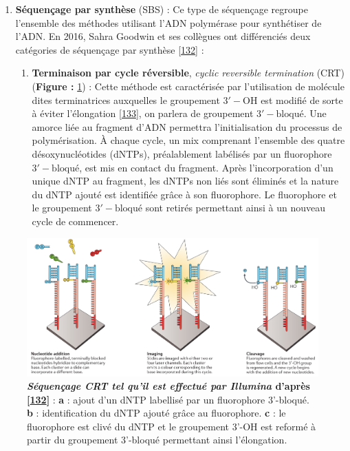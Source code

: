 \documentclass[12pt,a4paper,twoside]{ugathesis}
\providecommand{\tightlist}{%
  \setlength{\itemsep}{0pt}\setlength{\parskip}{0pt}}
\theoremstyle{definition}
\theoremstyle{definition}
\theoremstyle{definition}
\theoremstyle{remark}
\begin{document}
\begin{enumerate}
\def\labelenumi{\arabic{enumi}.}
\tightlist
\item
  \textbf{Séquençage par synthèse} (SBS) : Ce type de séquençage
  regroupe l'ensemble des méthodes utilisant l'ADN polymérase pour
  synthétiser de l'ADN. En 2016, Sahra Goodwin et ses collègues ont
  différenciés deux catégories de séquençage par synthèse
  {[}\protect\hyperlink{ref-Goodwin2016}{132}{]} :

  \begin{enumerate}
  \def\labelenumii{\alph{enumii}.}
  \tightlist
  \item
    \textbf{Terminaison par cycle réversible}, \emph{cyclic reversible
    termination} (CRT) (\textbf{Figure : }\ref{fig:pictcrtSeq}) : Cette
    méthode est caractérisée par l'utilisation de molécule dites
    terminatrices auxquelles le groupement \(\mathrm{3'-OH}\) est
    modifié de sorte à éviter l'élongation
    {[}\protect\hyperlink{ref-Guo2008}{133}{]}, on parlera de groupement
    \(\mathrm{3'-bloqué}\). Une amorce liée au fragment d'ADN permettra
    l'initialisation du processus de polymérisation. À chaque cycle, un
    mix comprenant l'ensemble des quatre désoxynucléotides (dNTPs),
    préalablement labélisés par un fluorophore \(\mathrm{3'-bloqué}\),
    est mis en contact du fragment. Après l'incorporation d'un unique
    dNTP au fragment, les dNTPs non liés sont éliminés et la nature du
    dNTP ajouté est identifiée grâce à son fluorophore. Le fluorophore
    et le groupement \(\mathrm{3'-bloqué}\) sont retirés permettant
    ainsi à un nouveau cycle de commencer.
  \end{enumerate}
\end{enumerate}

\begin{figure}

{\centering \includegraphics[scale=.24]{figure/CRT_seq_illumina} 

}

\caption[Séquençage CRT tel qu'il est effectué par Illumina]{\textbf{\emph{Séquençage CRT tel qu'il est effectué par
Illumina} d'après {[}\protect\hyperlink{ref-Goodwin2016}{132}{]}} :
\textbf{a} : ajout d'un dNTP labellisé par un fluorophore 3'-bloqué.
\textbf{b} : identification du dNTP ajouté grâce au fluorophore.
\textbf{c} : le fluorophore est clivé du dNTP et le groupement 3'-OH est
reformé à partir du groupement 3'-bloqué permettant ainsi l'élongation.}\label{fig:pictcrtSeq}
\end{figure}
\end{document}
